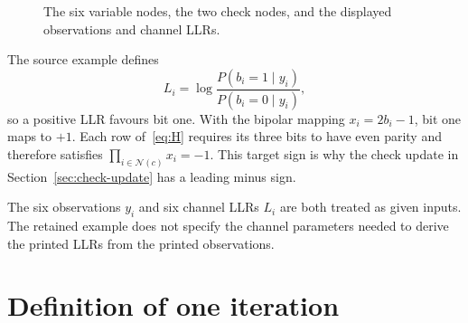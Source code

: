 \documentclass[11pt]{article}
\newcommand{\Ncal}{\mathcal{N}}
\begin{document}
\begin{figure}[htbp]
  \centering
  \caption{The six variable nodes, the two check nodes, and the displayed
  observations and channel LLRs.}
  \label{fig:graph}
\end{figure}

The source example defines
\begin{equation}
L_i=\log\frac{P(b_i=1\mid y_i)}{P(b_i=0\mid y_i)},
\label{eq:llr-convention}
\end{equation}
so a positive LLR favours bit one.  With the bipolar mapping
\(x_i=2b_i-1\), bit one maps to \(+1\).  Each row of~\eqref{eq:H} requires its
three bits to have even parity and therefore satisfies
\(\prod_{i\in\Ncal(c)}x_i=-1\).  This target sign is why the check update in
Section~\ref{sec:check-update} has a leading minus sign.

The six observations \(y_i\) and six channel LLRs \(L_i\) are both treated as
given inputs.  The retained example does not specify the channel parameters
needed to derive the printed LLRs from the printed observations.

\section{Definition of one iteration}
\end{document}
